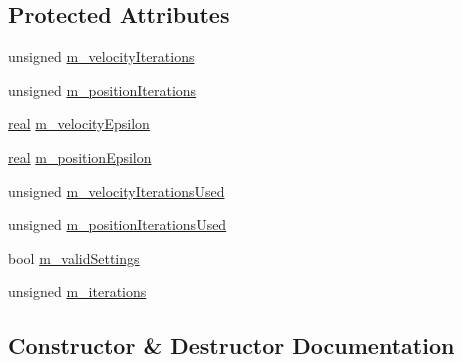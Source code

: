 \subsection*{Protected Attributes}
\begin{DoxyCompactItemize}
\item 
unsigned \mbox{\hyperlink{classrum_1_1_contact_resolver_a69b94c3b3bffe713655ed4b2209d17c3}{m\+\_\+velocity\+Iterations}}
\item 
unsigned \mbox{\hyperlink{classrum_1_1_contact_resolver_adb8b6bf74fdb76f502f412b947a6b6b9}{m\+\_\+position\+Iterations}}
\item 
\mbox{\hyperlink{namespacerum_a7e8cca23573d5eaead0f138cbaa4862c}{real}} \mbox{\hyperlink{classrum_1_1_contact_resolver_a2bd8f6cd976d45ce1fb8407c58d68e96}{m\+\_\+velocity\+Epsilon}}
\item 
\mbox{\hyperlink{namespacerum_a7e8cca23573d5eaead0f138cbaa4862c}{real}} \mbox{\hyperlink{classrum_1_1_contact_resolver_a7de7422d90c874c9b3852fb98612c6ce}{m\+\_\+position\+Epsilon}}
\item 
unsigned \mbox{\hyperlink{classrum_1_1_contact_resolver_a1f26bcb510350f094a9488c09125bcd7}{m\+\_\+velocity\+Iterations\+Used}}
\item 
unsigned \mbox{\hyperlink{classrum_1_1_contact_resolver_ad71be20b842af92754adcf9310a54fd6}{m\+\_\+position\+Iterations\+Used}}
\item 
bool \mbox{\hyperlink{classrum_1_1_contact_resolver_ab96daf85e76174045aada60b973bea4f}{m\+\_\+valid\+Settings}}
\item 
unsigned \mbox{\hyperlink{classrum_1_1_contact_resolver_a4e1ced2149209d061d3394bb8e9a7d6b}{m\+\_\+iterations}}
\end{DoxyCompactItemize}


\subsection{Constructor \& Destructor Documentation}
\mbox{\label{classrum_1_1_contact_resolver_adaf1fa2fd7b845fb3b0496505074bd01}} 
